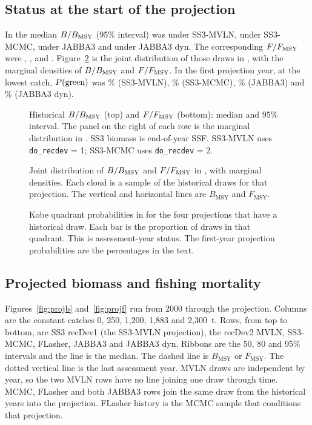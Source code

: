 \documentclass[11pt,a4paper]{article}
\begin{document}
\subsection{Status at the start of the projection}
In \histEnd{} the median $B/B_{\mathrm{MSY}}$ (95\% interval) was \histBMvln{} under
SS3-MVLN, \histBMcmc{} under SS3-MCMC, \histBJabba{} under JABBA3 and
\histBJabbaDyn{} under JABBA3 dyn. The corresponding $F/F_{\mathrm{MSY}}$ were
\histFMvln, \histFMcmc, \histFJabba{} and \histFJabbaDyn.
Figure~\ref{fig:phase} is the joint distribution of those draws in \histEnd,
with the marginal densities of $B/B_{\mathrm{MSY}}$ and $F/F_{\mathrm{MSY}}$.
In the first projection year, at the lowest catch, $P(\mathrm{green})$ was
\statusGreenMvln\% (SS3-MVLN), \statusGreenMcmc\% (SS3-MCMC),
\statusGreenJabba\% (JABBA3) and \statusGreenJabbaDyn\% (JABBA3 dyn).

\begin{figure}[H]
  \centering
  \caption{Historical $B/B_{\mathrm{MSY}}$ (top) and $F/F_{\mathrm{MSY}}$ (bottom): median and 95\%
    interval. The panel on the right of each row is the marginal
    distribution in \histEnd. SS3 biomass is end-of-year SSF. SS3-MVLN uses
    \texttt{do\_recdev} = 1; SS3-MCMC uses \texttt{do\_recdev} = 2.}
  \label{fig:hist}
\end{figure}

\begin{figure}[H]
  \centering
  \caption{Joint distribution of $B/B_{\mathrm{MSY}}$ and $F/F_{\mathrm{MSY}}$ in \histEnd, with marginal
    densities. Each cloud is a sample of the historical draws for that
    projection. The vertical and horizontal lines are $B_{\mathrm{MSY}}$ and
    $F_{\mathrm{MSY}}$.}
  \label{fig:phase}
\end{figure}

\begin{figure}[H]
  \centering
  \caption{Kobe quadrant probabilities in \histEnd{} for the four
    projections that have a historical draw. Each bar is the proportion of
    draws in that quadrant. This is assessment-year status. The
    first-year projection probabilities are the percentages in the text.}
  \label{fig:status}
\end{figure}

\subsection{Projected biomass and fishing mortality}
Figures~\ref{fig:projb} and~\ref{fig:projf} run from 2000 through the
projection. Columns are the constant catches 0, 250, 1{,}200, 1{,}883 and
2{,}300~t. Rows, from top to bottom, are SS3 recDev1 (the SS3-MVLN
projection), the recDev2 MVLN, SS3-MCMC, FLasher, JABBA3 and JABBA3 dyn.
Ribbons are the 50, 80 and 95\% intervals and the line is the median. The
dashed line is $B_{\mathrm{MSY}}$ or $F_{\mathrm{MSY}}$. The dotted vertical
line is the last assessment year. MVLN draws are independent by year, so
the two MVLN rows have no line joining one draw through time. MCMC, FLasher
and both JABBA3 rows join the same draw from the historical years into the
projection. FLasher history is the MCMC sample that conditions that
projection.
\end{document}
